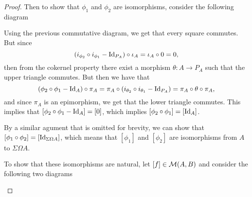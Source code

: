 \begin{proof}
    Then to show that \( \phi_1 \) and \( \phi_2 \) are isomorphisms, consider the following diagram
    \begin{center}
    \end{center}

    Using the previous commutative diagram, we get that every square commutes. But since
    \[
        (i_{\phi_2} \circ i_{\phi_1} - \operatorname{Id}_{P_A}) \circ \iota_A = \iota_A \circ 0 = 0,
    \]
    then from the cokernel property there exist a morphism \( \theta: A \to P_A \) such that the upper triangle commutes. But then we have that
    \[
        (\phi_2 \circ \phi_1 - \operatorname{Id}_A) \circ \pi_A = \pi_A \circ (i_{\theta_2} \circ i_{\theta_1} - \operatorname{Id}_{P_A}) = \pi_A \circ \theta \circ \pi_A,
    \]
    and since \( \pi_A \) is an epimorphism, we get that the lower triangle commutes. This implies that \( [\phi_2 \circ \phi_1 - \operatorname{Id}_A] = [0] \), which implies \( [\phi_2 \circ \phi_1] = [\operatorname{Id}_A] \).
    
    By a similar agument that is omitted for brevity, we can show that \( [\phi_1 \circ \phi_2] = [\operatorname{Id}_{\Sigma\Omega A}] \), which means that \( [\phi_1] \) and \( [\phi_2] \) are isomorphisms from \( A \) to \( \Sigma\Omega A \).

    To show that these isomorphisms are natural, let \( [f] \in {\mathcal{M}}(A, B) \) and consider the following two diagrams
    \begin{center}
\end{center}
\end{proof}
